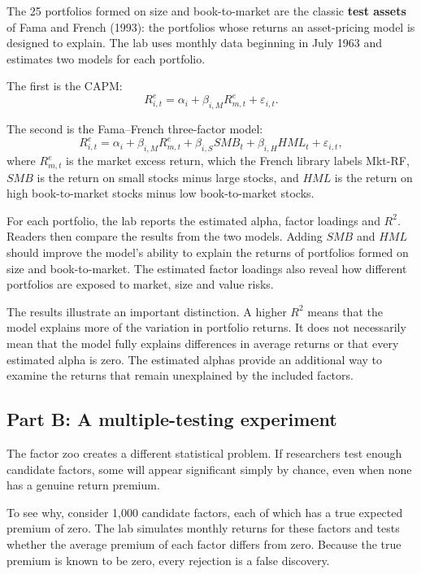 The 25 portfolios formed on size and book-to-market are the classic \textbf{test assets} of Fama and French (1993): the portfolios whose returns an asset-pricing model is designed to explain. The lab uses monthly data beginning in July 1963 and estimates two models for each portfolio.

The first is the CAPM:
\begin{equation}
  R^{e}_{i,t}
  = \alpha_i+\beta_{i,M}R^{e}_{m,t}+\varepsilon_{i,t}.
  \label{eq:03-lab-capm}
\end{equation}

The second is the Fama--French three-factor model:
\begin{equation}
  R^{e}_{i,t}
  = \alpha_i+\beta_{i,M}R^{e}_{m,t}
  +\beta_{i,S}SMB_t
  +\beta_{i,H}HML_t+\varepsilon_{i,t},
  \label{eq:03-lab-ff3}
\end{equation}
where $R^{e}_{m,t}$ is the market excess return, which the French library labels Mkt-RF, $SMB$ is the return on small stocks minus large stocks, and $HML$ is the return on high book-to-market stocks minus low book-to-market stocks.

For each portfolio, the lab reports the estimated alpha, factor loadings and $R^2$. Readers then compare the results from the two models. Adding $SMB$ and $HML$ should improve the model's ability to explain the returns of portfolios formed on size and book-to-market. The estimated factor loadings also reveal how different portfolios are exposed to market, size and value risks.

The results illustrate an important distinction. A higher $R^2$ means that the model explains more of the variation in portfolio returns. It does not necessarily mean that the model fully explains differences in average returns or that every estimated alpha is zero. The estimated alphas provide an additional way to examine the returns that remain unexplained by the included factors.

\subsection*{Part B: A multiple-testing experiment}

The factor zoo creates a different statistical problem. If researchers test enough candidate factors, some will appear significant simply by chance, even when none has a genuine return premium.

To see why, consider 1,000 candidate factors, each of which has a true expected premium of zero. The lab simulates monthly returns for these factors and tests whether the average premium of each factor differs from zero. Because the true premium is known to be zero, every rejection is a false discovery.

